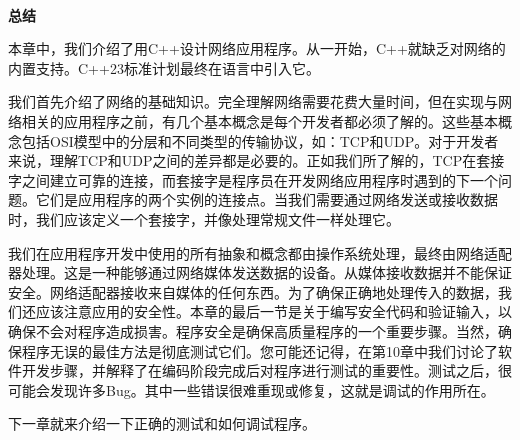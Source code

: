 \noindent\textbf{}\ \par
\textbf{总结} \  \par
本章中，我们介绍了用C++设计网络应用程序。从一开始，C++就缺乏对网络的内置支持。C++23标准计划最终在语言中引入它。 \par                                                                                                                                                                                                                                                                                                                                                                                                                                                                                                                                                                                                                                                                                                                                                                                                                                                                                                                                                                                                                                                                                                                                                                                                                                                                                                                                    
我们首先介绍了网络的基础知识。完全理解网络需要花费大量时间，但在实现与网络相关的应用程序之前，有几个基本概念是每个开发者都必须了解的。这些基本概念包括OSI模型中的分层和不同类型的传输协议，如：TCP和UDP。对于开发者来说，理解TCP和UDP之间的差异都是必要的。正如我们所了解的，TCP在套接字之间建立可靠的连接，而套接字是程序员在开发网络应用程序时遇到的下一个问题。它们是应用程序的两个实例的连接点。当我们需要通过网络发送或接收数据时，我们应该定义一个套接字，并像处理常规文件一样处理它。 \par
我们在应用程序开发中使用的所有抽象和概念都由操作系统处理，最终由网络适配器处理。这是一种能够通过网络媒体发送数据的设备。从媒体接收数据并不能保证安全。网络适配器接收来自媒体的任何东西。为了确保正确地处理传入的数据，我们还应该注意应用的安全性。本章的最后一节是关于编写安全代码和验证输入，以确保不会对程序造成损害。程序安全是确保高质量程序的一个重要步骤。当然，确保程序无误的最佳方法是彻底测试它们。您可能还记得，在第10章中我们讨论了软件开发步骤，并解释了在编码阶段完成后对程序进行测试的重要性。测试之后，很可能会发现许多Bug。其中一些错误很难重现或修复，这就是调试的作用所在。 \par
下一章就来介绍一下正确的测试和如何调试程序。 \par

